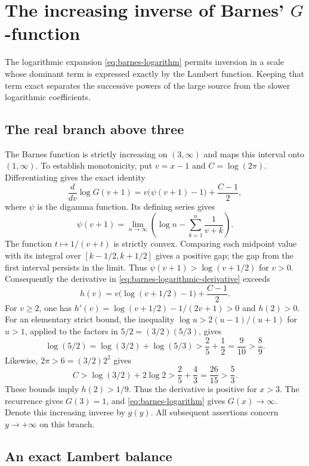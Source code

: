 \section{The increasing inverse of Barnes' \texorpdfstring{$G$}{G}-function}
\label{sec:barnes-inverse}

The logarithmic expansion \eqref{eq:barnes-logarithm} permits inversion
in a scale whose dominant term is expressed exactly by the Lambert
function. Keeping that term exact separates the successive powers of
the large source from the slower logarithmic coefficients.

\subsection{The real branch above three}

The Barnes function is strictly increasing on $(3,\infty)$ and maps
this interval onto $(1,\infty)$. To establish monotonicity, put
$v=x-1$ and $C=\log(2\pi)$. Differentiating
\cite[(5.17.4)]{dlmf} gives the exact identity
\begin{equation}
 \frac{d}{dv}\log G(v+1)
   =v\bigl(\psi(v+1)-1\bigr)+\frac{C-1}{2},
 \label{eq:barnes-logarithmic-derivative}
\end{equation}
where $\psi$ is the digamma function. Its defining series gives
\[
 \psi(v+1)=\lim_{n\to\infty}
   \left(\log n-\sum_{k=1}^{n}\frac1{v+k}\right).
\]
The function $t\mapsto1/(v+t)$ is strictly convex. Comparing each
midpoint value with its integral over $[k-1/2,k+1/2]$ gives a positive
gap; the gap from the first interval persists in the limit. Thus
$\psi(v+1)>\log(v+1/2)$ for $v>0$. Consequently the derivative
in \eqref{eq:barnes-logarithmic-derivative} exceeds
\[
 h(v)=v\bigl(\log(v+1/2)-1\bigr)+\frac{C-1}{2}.
\]
For $v\ge2$, one has
$h'(v)=\log(v+1/2)-1/(2v+1)>0$ and $h(2)>0$.
For an elementary strict bound, the inequality
$\log u>2(u-1)/(u+1)$ for $u>1$, applied to the factors in
$5/2=(3/2)(5/3)$, gives
\[
 \log(5/2)=\log(3/2)+\log(5/3)
   >\frac25+\frac12=\frac9{10}>\frac89.
\]
Likewise, $2\pi>6=(3/2)2^2$ gives
\[
 C>\log(3/2)+2\log2
   >\frac25+\frac43=\frac{26}{15}>\frac53.
\]
These bounds imply $h(2)>1/9$.
Thus the derivative is positive for $x>3$.
The recurrence gives $G(3)=1$, and \eqref{eq:barnes-logarithm}
gives $G(x)\to\infty$. Denote this increasing inverse by $g(y)$.
All subsequent assertions concern $y\to+\infty$ on this branch.

\subsection{An exact Lambert balance}

